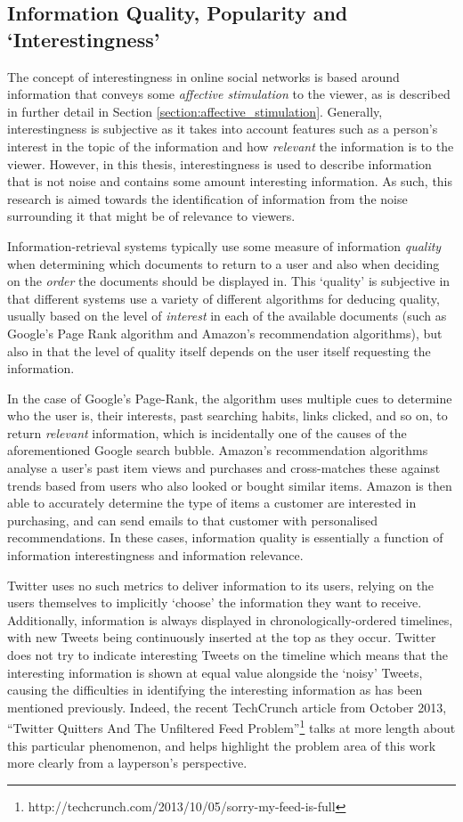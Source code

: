 \subsection{Information Quality, Popularity and `Interestingness'}
The concept of interestingness in online social networks is based around information that conveys some \textit{affective stimulation} to the viewer, as is described in further detail in Section \ref{section:affective_stimulation}. Generally, interestingness is subjective as it takes into account features such as a person's interest in the topic of the information and how \textit{relevant} the information is to the viewer. However, in this thesis, interestingness is used to describe information that is not noise and contains some amount interesting information. As such, this research is aimed towards the identification of information from the noise surrounding it that might be of relevance to viewers.

Information-retrieval systems typically use some measure of information \textit{quality} when determining which documents to return to a user and also when deciding on the \textit{order} the documents should be displayed in. This `quality' is subjective in that different systems use a variety of different algorithms for deducing quality, usually based on the level of \textit{interest} in each of the available documents (such as Google's Page Rank algorithm and Amazon's recommendation algorithms), but also in that the level of quality itself depends on the user itself requesting the information. 

In the case of Google's Page-Rank, the algorithm uses multiple cues to determine who the user is, their interests, past searching habits, links clicked, and so on, to return \textit{relevant} information, which is incidentally one of the causes of the aforementioned Google search bubble. Amazon's recommendation algorithms analyse a user's past item views and purchases and cross-matches these against trends based from users who also looked or bought similar items. Amazon is then able to accurately determine the type of items a customer are interested in purchasing, and can send emails to that customer with personalised recommendations. In these cases, information quality is essentially a function of information interestingness and information relevance.

Twitter uses no such metrics to deliver information to its users, relying on the users themselves to implicitly `choose' the information they want to receive. Additionally, information is always displayed in chronologically-ordered timelines, with new Tweets being continuously inserted at the top as they occur. Twitter does not try to indicate interesting Tweets on the timeline which means that the interesting information is shown at equal value alongside the `noisy' Tweets, causing the difficulties in identifying the interesting information as has been mentioned previously. Indeed, the recent TechCrunch article from October 2013, ``Twitter Quitters And The Unfiltered Feed Problem''\footnote{http://techcrunch.com/2013/10/05/sorry-my-feed-is-full} talks at more length about this particular phenomenon, and helps highlight the problem area of this work more clearly from a layperson's perspective.

